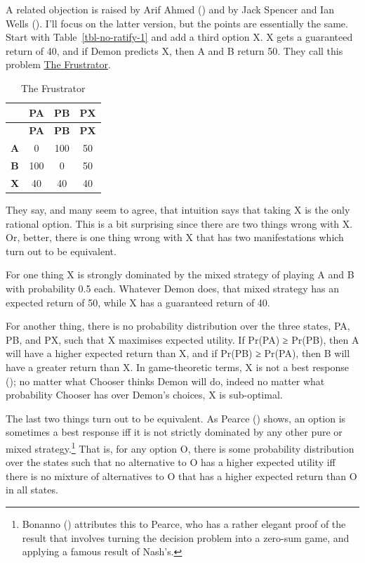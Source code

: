 \documentclass[
  12pt,
  letterpaper,
  DIV=11,
  numbers=noendperiod]{scrreprt}
\begin{document}
A related objection is raised by Arif Ahmed
() and by Jack Spencer and Ian Wells
(). I'll focus on the latter
version, but the points are essentially the same. Start with
Table~\ref{tbl-no-ratify-1} and add a third option X. X gets a
guaranteed return of 40, and if Demon predicts X, then A and B return
50. They call this problem \hyperref[tbl-frustrator]{The Frustrator}.

\begin{longtable}[]{@{}cccc@{}}
\caption{The Frustrator}\label{tbl-frustrator}\tabularnewline
\toprule\noalign{}
& \textbf{PA} & \textbf{PB} & \textbf{PX} \\
\midrule\noalign{}
\endfirsthead
\toprule\noalign{}
& \textbf{PA} & \textbf{PB} & \textbf{PX} \\
\midrule\noalign{}
\endhead
\bottomrule\noalign{}
\endlastfoot
\textbf{A} & 0 & 100 & 50 \\
\textbf{B} & 100 & 0 & 50 \\
\textbf{X} & 40 & 40 & 40 \\
\end{longtable}

They say, and many seem to agree, that intuition says that taking X is
the only rational option. This is a bit surprising since there are two
things wrong with X. Or, better, there is one thing wrong with X that
has two manifestations which turn out to be equivalent.

For one thing X is strongly dominated by the mixed strategy of playing A
and B with probability 0.5 each. Whatever Demon does, that mixed
strategy has an expected return of 50, while X has a guaranteed return
of 40.

For another thing, there is no probability distribution over the three
states, PA, PB, and PX, such that X maximises expected utility. If
Pr(PA) ≥ Pr(PB), then A will have a higher expected return than X, and
if Pr(PB) ≥ Pr(PA), then B will have a greater return than X. In
game-theoretic terms, X is not a best response
(); no matter what Chooser
thinks Demon will do, indeed no matter what probability Chooser has over
Demon's choices, X is sub-optimal.

The last two things turn out to be equivalent. As Pearce
() shows, an option is sometimes a best
response iff it is not strictly dominated by any other pure or mixed
strategy.\footnote{Bonanno ()
  attributes this to Pearce, who has a rather elegant proof of the
  result that involves turning the decision problem into a zero-sum
  game, and applying a famous result of Nash's.} That is, for any option
O, there is some probability distribution over the states such that no
alternative to O has a higher expected utility iff there is no mixture
of alternatives to O that has a higher expected return than O in all
states.
\end{document}
